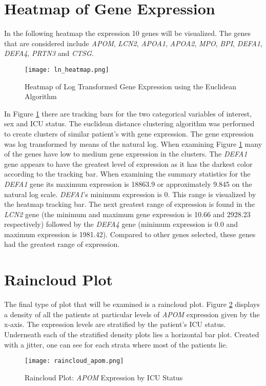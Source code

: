 \documentclass{article}
\begin{document}
\section{Heatmap of Gene Expression}
In the following heatmap the expression 10 genes will be visualized. The genes that are considered include \emph{APOM}, \emph{LCN2}, \emph{APOA1}, \emph{APOA2}, \emph{MPO}, \emph{BPI}, \emph{DEFA1}, \emph{DEFA4}, \emph{PRTN3} and \emph{CTSG}. 
\newpage
\begin{figure}[h]
    \centering
    \texttt{[image: ln\_heatmap.png]}
    \caption{Heatmap of Log Transformed Gene Expression using the Euclidean Algorithm}
    \label{fig:heatmap}
\end{figure}

In Figure \ref{fig:heatmap} there are tracking bars for the two categorical variables of interest, sex and ICU status. The euclidean distance clustering algorithm was performed to create clusters of similar patient's with gene expression. The gene expression was log transformed by means of the natural log. When examining Figure \ref{fig:heatmap} many of the genes have low to medium gene expression in the clusters. The \emph{DEFA1} gene appears to have the greatest level of expression as it has the darkest color according to the tracking bar. When examining the summary statistics for the \emph{DEFA1} gene its maximum expression is 18863.9 or approximately 9.845 on the natural log scale. \emph{DEFA1}'s minimum expression is 0. This range is visualized by the heatmap tracking bar. The next greatest range of expression is found in the \emph{LCN2} gene (the minimum and maximum gene expression is 10.66 and 2928.23 respectively) followed by the \emph{DEFA4} gene (minimum expression is 0.0 and maximum expression is 1981.42). Compared to other genes selected, these genes had the greatest range of expression. 

\section{Raincloud Plot}
The final type of plot that will be examined is a raincloud plot. Figure \ref{fig:raincloud} displays a density of all the patients at particular levels of \emph{APOM} expression given by the x-axis. The expression levels are stratified by the patient's ICU status. Underneath each of the stratified density plots lies a horizontal bar plot. Created with a jitter, one can see for each strata where most of the patients lie. 

\begin{figure}[h]
    \centering
    \texttt{[image: raincloud\_apom.png]}
    \caption{Raincloud Plot: \emph{APOM} Expression by ICU Status}
    \label{fig:raincloud}
\end{figure}
\end{document}

